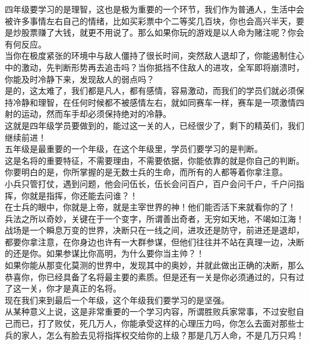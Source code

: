 \begin{multicols}{\theparacolNo}
四年级要学习的是理智，这也是极为重要的一个环节，我们作为普通人，生活中会被许多事情左右自己的情绪，比如买彩票中个二等奖几百块，你也会高兴半天，要是炒股票赚了大钱，就更不用说了。那么如果你玩的游戏是以人命为赌注呢？你会有何反应。\\

当你在极度紧张的环境中与敌人僵持了很长时间，突然敌人退却了，你能遏制住心中的激动，先判断形势再去追击吗？当你抵挡不住敌人的进攻，全军即将崩溃时，你能及时冷静下来，发现敌人的弱点吗？\\

是的，这太难了，我们都是凡人，都有感情，容易激动，而我们的学员们就必须保持冷静和理智，在任何时候都不被感情左右，就如同赛车一样，赛车是一项激情四射的运动，然而车手却必须保持绝对的冷静。\\

这就是四年级学员要做到的，能过这一关的人，已经很少了，剩下的精英们，我们继续前进！\\

五年级是最重要的一个年级，在这个年级里，学员们要学习的是判断。\\

这是名将的重要特征，不需要理由，不需要依据，你能依靠的就是你自己的判断。你要明白的是，你所掌握的是无数士兵的生命，而所有的人都等着你拿注意。\\

小兵只管打仗，遇到问题，他会问伍长，伍长会问百户，百户会问千户，千户问指挥，你就是指挥，你还能去问谁？！\\

在士兵的眼中，你就是上帝，就是主宰世界的神！他们能否活下来就看你的了！\\

兵法之所以奇妙，关键在于一个变字，所谓善出奇者，无穷如天地，不竭如江海！战场是一个瞬息万变的世界，决断只在一线之间，进攻还是防守，前进还是退却，都要你拿注意，在你身边也许有一大群参谋，但他们往往并不站在真理一边，决断的还是你。如果参谋比你高明，为什么要你当主帅？！\\

如果你能从那变化莫测的世界中，发现其中的奥妙，并就此做出正确的决断，那么恭喜你，你已经具备了名将最主要的素质。但是还有一关是你必须通过的，只有过了这一关，你才是真正的名将。\\

现在我们来到最后一个年级，这个年级我们要学习的是坚强。\\

从某种意义上说，这是非常重要的一个学习内容，所谓胜败兵家常事，不过安慰自己而已，打了败仗，死几万人，你能承受这样的心理压力吗，你怎么去面对那些士兵的家人，怎么有脸去见将指挥权交给你的上级？那是几万人命，不是几万只鸡！\\


\end{multicols}
